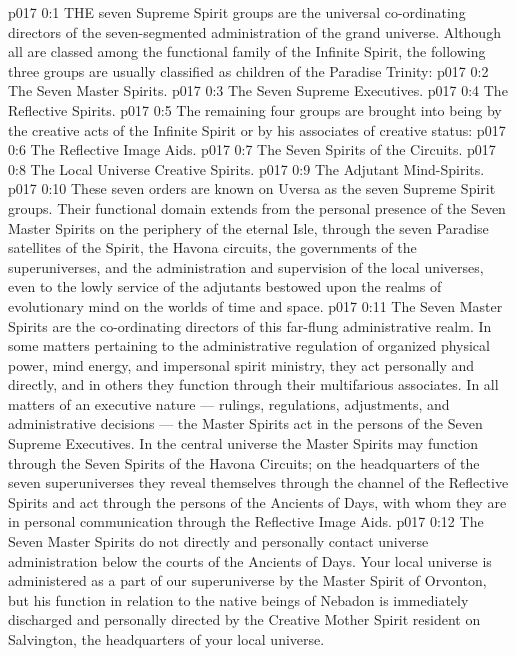 \vs p017 0:1 THE seven Supreme Spirit groups are the universal co\hyp{}ordinating directors of the seven\hyp{}segmented administration of the grand universe. Although all are classed among the functional family of the Infinite Spirit, the following three groups are usually classified as children of the Paradise Trinity:
\vs p017 0:2 \bibnobreakspace The Seven Master Spirits.
\vs p017 0:3 \bibnobreakspace The Seven Supreme Executives.
\vs p017 0:4 \bibnobreakspace The Reflective Spirits.
\vs p017 0:5 \pc The remaining four groups are brought into being by the creative acts of the Infinite Spirit or by his associates of creative status:
\vs p017 0:6 \bibnobreakspace The Reflective Image Aids.
\vs p017 0:7 \bibnobreakspace The Seven Spirits of the Circuits.
\vs p017 0:8 \bibnobreakspace The Local Universe Creative Spirits.
\vs p017 0:9 \bibnobreakspace The Adjutant Mind\hyp{}Spirits.
\vs p017 0:10 \pc These seven orders are known on Uversa as the seven Supreme Spirit groups. Their functional domain extends from the personal presence of the Seven Master Spirits on the periphery of the eternal Isle, through the seven Paradise satellites of the Spirit, the Havona circuits, the governments of the superuniverses, and the administration and supervision of the local universes, even to the lowly service of the adjutants bestowed upon the realms of evolutionary mind on the worlds of time and space.
\vs p017 0:11 The Seven Master Spirits are the co\hyp{}ordinating directors of this far\hyp{}flung administrative realm. In some matters pertaining to the administrative regulation of organized physical power, mind energy, and impersonal spirit ministry, they act personally and directly, and in others they function through their multifarious associates. In all matters of an executive nature --- rulings, regulations, adjustments, and administrative decisions --- the Master Spirits act in the persons of the Seven Supreme Executives. In the central universe the Master Spirits may function through the Seven Spirits of the Havona Circuits; on the headquarters of the seven superuniverses they reveal themselves through the channel of the Reflective Spirits and act through the persons of the Ancients of Days, with whom they are in personal communication through the Reflective Image Aids.
\vs p017 0:12 The Seven Master Spirits do not directly and personally contact universe administration below the courts of the Ancients of Days. Your local universe is administered as a part of our superuniverse by the Master Spirit of Orvonton, but his function in relation to the native beings of Nebadon is immediately discharged and personally directed by the Creative Mother Spirit resident on Salvington, the headquarters of your local universe.
